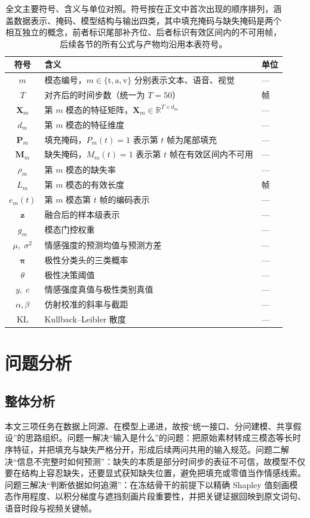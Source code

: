 \documentclass[withoutpreface,bwprint]{cumcmthesis}
\begin{document}
\begin{table}[H]
\centering
\caption{全文主要符号、含义与单位对照。符号按在正文中首次出现的顺序排列，涵盖数据表示、掩码、模型结构与输出四类，其中填充掩码与缺失掩码是两个相互独立的概念，前者标识尾部补齐位、后者标识有效区间内的不可用帧，后续各节的所有公式与产物均沿用本表符号。}
\label{tab:sym}
\begin{tabular}{cll}
\toprule
符号 & 含义 & 单位 \\
\midrule
$m$ & 模态编号，$m\in\{\mathrm{t},\mathrm{a},\mathrm{v}\}$ 分别表示文本、语音、视觉 & --- \\
$T$ & 对齐后的时间步数（统一为 $T=50$） & 帧 \\
$\bm{X}_m$ & 第 $m$ 模态的特征矩阵，$\bm{X}_m\in\mathbb{R}^{T\times d_m}$ & --- \\
$d_m$ & 第 $m$ 模态的特征维度 & --- \\
$\bm{P}_m$ & 填充掩码，$P_{m}(t)=1$ 表示第 $t$ 帧为尾部填充 & --- \\
$\bm{M}_m$ & 缺失掩码，$M_{m}(t)=1$ 表示第 $t$ 帧在有效区间内不可用 & --- \\
$\rho_m$ & 第 $m$ 模态的缺失率 & --- \\
$L_m$ & 第 $m$ 模态的有效长度 & 帧 \\
$e_m(t)$ & 第 $m$ 模态第 $t$ 帧的编码表示 & --- \\
$\bm{z}$ & 融合后的样本级表示 & --- \\
$g_m$ & 模态门控权重 & --- \\
$\mu,\;\sigma^2$ & 情感强度的预测均值与预测方差 & --- \\
$\bm{\pi}$ & 极性分类头的三类概率 & --- \\
$\theta$ & 极性决策阈值 & --- \\
$y,\;c$ & 情感强度真值与极性类别真值 & --- \\
$\alpha,\beta$ & 仿射校准的斜率与截距 & --- \\
$\mathrm{KL}$ & Kullback--Leibler 散度 & --- \\
\bottomrule
\end{tabular}
\end{table}

\section{问题分析}
\subsection{整体分析}
本文三项任务在数据上同源、在模型上递进，故按“统一接口、分问建模、共享假设”的思路组织。问题一解决“输入是什么”的问题：把原始素材转成三模态等长时序特征，并把填充与缺失严格分开，形成后续两问共用的输入规范。问题二解决“信息不完整时如何预测”：缺失的本质是部分时间步的表征不可信，故模型不仅要在结构上容忍缺失，还要显式获知缺失位置，避免把填充或零值当作情感线索。问题三解决“判断依据如何追溯”：在冻结骨干的前提下以精确 Shapley 值刻画模态作用程度、以积分梯度与遮挡刻画片段重要性，并把关键证据回映到原文词句、语音时段与视频关键帧。
\end{document}
